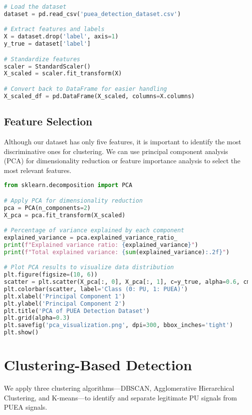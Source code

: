 \begin{lstlisting}[language=Python, caption=Feature Scaling Code]
# Load the dataset
dataset = pd.read_csv('puea_detection_dataset.csv')

# Extract features and labels
X = dataset.drop('label', axis=1)
y_true = dataset['label']

# Standardize features
scaler = StandardScaler()
X_scaled = scaler.fit_transform(X)

# Convert back to DataFrame for easier handling
X_scaled_df = pd.DataFrame(X_scaled, columns=X.columns)
\end{lstlisting}

\subsection{Feature Selection}
Although our dataset has only five features, it is important to identify the most discriminative ones for clustering. We can use principal component analysis (PCA) for dimensionality reduction or feature importance analysis to select the most relevant features.

\begin{lstlisting}[language=Python, caption=Feature Selection Code]
from sklearn.decomposition import PCA

# Apply PCA for dimensionality reduction
pca = PCA(n_components=2)
X_pca = pca.fit_transform(X_scaled)

# Percentage of variance explained by each component
explained_variance = pca.explained_variance_ratio_
print(f"Explained variance ratio: {explained_variance}")
print(f"Total explained variance: {sum(explained_variance):.2f}")

# Plot PCA results to visualize data distribution
plt.figure(figsize=(10, 6))
scatter = plt.scatter(X_pca[:, 0], X_pca[:, 1], c=y_true, alpha=0.6, cmap='viridis')
plt.colorbar(scatter, label='Class (0: PU, 1: PUEA)')
plt.xlabel('Principal Component 1')
plt.ylabel('Principal Component 2')
plt.title('PCA of PUEA Detection Dataset')
plt.grid(alpha=0.3)
plt.savefig('pca_visualization.png', dpi=300, bbox_inches='tight')
plt.show()
\end{lstlisting}

\section{Clustering-Based Detection}
We apply three clustering algorithms—DBSCAN, Agglomerative Hierarchical Clustering, and K-means—to identify and separate legitimate PU signals from PUEA signals.

